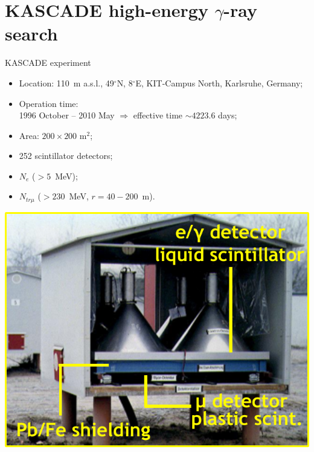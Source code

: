 \section{KASCADE high-energy \texorpdfstring{$\gamma$}{gamma}-ray search}

\begin{frame}{KASCADE experiment}
\begin{itemize}
\item Location: 110~m a.s.l., 49$^\circ$N, 8$^\circ$E, KIT-Campus North, Karlsruhe, Germany;
\end{itemize}
\vspace{-\itemsep}
\begin{minipage}[c]{0.5\textwidth}
\begin{itemize}
\item Operation time:\\1996 October -- 2010 May $\Rightarrow$ effective time $\sim 4223.6$ days;
\item Area: $200 \times 200$ m$^2$;
\item 252 scintillator detectors;
\item $N_e$ ($> 5$~MeV);
\item $N_{tr \mu}$ ($> 230$~MeV, $r = 40 - 200$~m).
\end{itemize}
\end{minipage}\hfill
\begin{minipage}[c]{0.49\textwidth}
\includegraphics[width=1\textwidth]{pics/KASCADE-station.pdf}
\end{minipage}
\end{frame}


